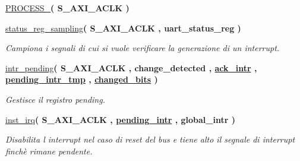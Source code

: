 \begin{DoxyCompactItemize}
\item 
\mbox{\label{classUART__v1__0__S00__AXI_1_1arch__imp_a6b83b9626c3e03102e58d7d89aad43eb}} 
\hyperlink{classUART__v1__0__S00__AXI_1_1arch__imp_a6b83b9626c3e03102e58d7d89aad43eb}{P\+R\+O\+C\+E\+S\+S\+\_}{\bfseries  ( {\bfseries \textcolor{vhdlchar}{S\+\_\+\+A\+X\+I\+\_\+\+A\+C\+LK}\textcolor{vhdlchar}{ }} )}
\item 
\hyperlink{classUART__v1__0__S00__AXI_1_1arch__imp_a1c2628d089a3915505bce1cba131c80a}{status\+\_\+reg\+\_\+sampling}{\bfseries  ( {\bfseries \textcolor{vhdlchar}{S\+\_\+\+A\+X\+I\+\_\+\+A\+C\+LK}\textcolor{vhdlchar}{ }} , {\bfseries \textcolor{vhdlchar}{uart\+\_\+status\+\_\+reg}\textcolor{vhdlchar}{ }} )}
\begin{DoxyCompactList}\small\item\em Campiona i segnali di cui si vuole verificare la generazione di un interrupt. \end{DoxyCompactList}\item 
\hyperlink{classUART__v1__0__S00__AXI_1_1arch__imp_a5449c5c114aa406ec50242ff099946a4}{intr\+\_\+pending}{\bfseries  ( {\bfseries \textcolor{vhdlchar}{S\+\_\+\+A\+X\+I\+\_\+\+A\+C\+LK}\textcolor{vhdlchar}{ }} , {\bfseries \textcolor{vhdlchar}{change\+\_\+detected}\textcolor{vhdlchar}{ }} , {\bfseries {\bfseries \hyperlink{classUART__v1__0__S00__AXI_1_1arch__imp_a65e0e54a6d565935dd24ce96dbbce53a}{ack\+\_\+intr}} \textcolor{vhdlchar}{ }} , {\bfseries {\bfseries \hyperlink{classUART__v1__0__S00__AXI_1_1arch__imp_a95f416160863ad569dbb9fa2956c526d}{pending\+\_\+intr\+\_\+tmp}} \textcolor{vhdlchar}{ }} , {\bfseries {\bfseries \hyperlink{classUART__v1__0__S00__AXI_1_1arch__imp_a8b1599924c5da95abaa3e673fc0d2cb7}{changed\+\_\+bits}} \textcolor{vhdlchar}{ }} )}
\begin{DoxyCompactList}\small\item\em Gestisce il registro pending. \end{DoxyCompactList}\item 
\hyperlink{classUART__v1__0__S00__AXI_1_1arch__imp_ad49f0dfc577739899b90a7243c22a1cd}{inst\+\_\+irq}{\bfseries  ( {\bfseries \textcolor{vhdlchar}{S\+\_\+\+A\+X\+I\+\_\+\+A\+C\+LK}\textcolor{vhdlchar}{ }} , {\bfseries {\bfseries \hyperlink{classUART__v1__0__S00__AXI_1_1arch__imp_a5595ca2e548ef1d12b7fa2bac3e2aa00}{pending\+\_\+intr}} \textcolor{vhdlchar}{ }} , {\bfseries \textcolor{vhdlchar}{global\+\_\+intr}\textcolor{vhdlchar}{ }} )}
\begin{DoxyCompactList}\small\item\em Disabilita l\textquotesingle{} interrupt nel caso di reset del bus e tiene alto il segnale di interrupt finchè rimane pendente. \end{DoxyCompactList}\end{DoxyCompactItemize}
